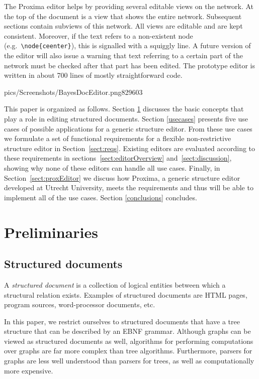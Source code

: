 \documentclass{speauth}
\begin{document}
The Proxima editor helps by providing several editable views on the network. At the top of the document is a view that shows the entire network. Subsequent sections contain subviews of this network. All views are editable and are kept consistent. Moreover, if the text refers to a non-existent node (e.g.\ \verb|\node{ceenter}|), this is signalled with a squiggly line. A future version of the editor will also issue a warning that text referring to a certain part of the network must be checked after that part has been edited. The prototype editor is written in about 700 lines of mostly straightforward code.


          {pics/Screenshots/BayesDocEditor.png}{829}{603}

\cbend

This paper is organized as follows. Section \ref{preliminaries} discusses the basic concepts that play a role in editing structured documents. Section \ref{usecases} presents five use cases of possible applications for a generic structure editor. From these use cases we formulate a set of functional requirements for a flexible non-restrictive structure editor in Section~\ref{sect:reqs}. Existing editors are evaluated according to these requirements in sections~\ref{sect:editorOverview} and~\ref{sect:discussion}, showing why none of these editors can handle all use cases. Finally, in Section~\ref{sect:proxEditor} we discuss how Proxima, a generic structure editor developed at Utrecht University, meets the requirements and thus will be able to implement all of the use cases. Section \ref{conclusions} concludes.

\section{Preliminaries}
\label{preliminaries}

\subsection{Structured documents} 
\label{sect:structdocs}

A {\em structured document} is a collection of logical entities between which a structural relation exists. Examples of structured documents are HTML pages, program sources, word-processor documents, etc. 

In this paper, we restrict ourselves to structured documents that have a tree structure that can be described by an EBNF grammar. Although graphs can be viewed as structured documents as well, algorithms for performing computations over graphs are far more complex than tree algorithms. Furthermore, parsers for graphs are less well understood than parsers for trees, as well as computationally more expensive. 
\end{document}
